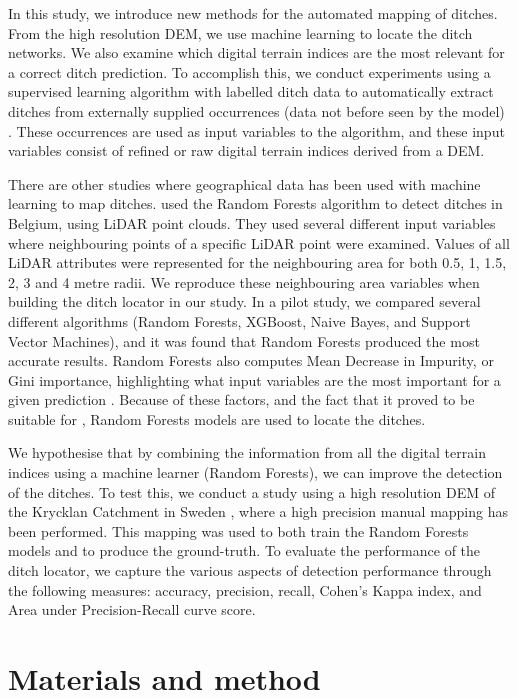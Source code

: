 \documentclass[]{interact}
\theoremstyle{plain}%
\theoremstyle{definition}
\theoremstyle{remark}
\begin{document}
In this study, we introduce new methods for the automated mapping of ditches. From the high resolution DEM, we use machine learning to locate the ditch networks. We also examine which digital terrain indices are the most relevant for a correct ditch prediction. To accomplish this, we conduct experiments using a supervised learning algorithm with labelled ditch data to automatically extract ditches from externally supplied occurrences (data not before seen by the model) \citep{kotsiantis}. These occurrences are used as input variables to the algorithm, and these input variables consist of refined or raw digital terrain indices derived from a DEM.

There are other studies where geographical data has been used with machine learning to map ditches. \citet{roelens} used the Random Forests algorithm to detect ditches in Belgium, using LiDAR point clouds. They used several different input variables where neighbouring points of a specific LiDAR point were examined. Values of all LiDAR attributes were represented for the neighbouring area for both 0.5, 1, 1.5, 2, 3 and 4 metre radii. We reproduce these neighbouring area variables when building the ditch locator in our study. In a pilot study, we compared several different algorithms (Random Forests, XGBoost, Naive Bayes, and Support Vector Machines), and it was found that Random Forests produced the most accurate results. Random Forests also computes Mean Decrease in Impurity, or Gini importance, highlighting what input variables are the most important for a given prediction \citep{gini}. Because of these factors, and the fact that it proved to be suitable for \citet{roelens}, Random Forests models are used to locate the ditches.

We hypothesise that by combining the information from all the digital terrain indices using a machine learner (Random Forests), we can improve the detection of the ditches. To test this, we conduct a study using a high resolution DEM of the Krycklan Catchment in Sweden \citep{krycklancatchment}, where a high precision manual mapping has been performed. This mapping was used to both train the Random Forests models and to produce the ground-truth. To evaluate the performance of the ditch locator, we capture the various aspects of detection performance through the following measures: accuracy, precision, recall, Cohen’s Kappa index, and Area under Precision-Recall curve score.

\section{Materials and method}
\label{method}
\end{document}
